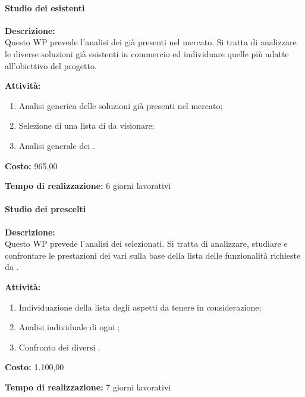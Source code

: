 \paragraph{Studio dei \sw esistenti }
\begin{description}
\item{\bfseries Descrizione:}\\
Questo WP prevede l'analisi dei \sw già presenti nel mercato. Si tratta di analizzare le diverse soluzioni già esistenti in commercio ed individuare quelle più adatte all'obiettivo del progetto. 

  \item  {\bfseries Attività:}
	\begin{enumerate}
		  \item Analisi generica delle soluzioni \sw già presenti nel mercato;
		  \item Selezione di una lista di \sw da visionare;
		  \item Analisi generale dei \sw.
		\end{enumerate}
  \item  {\bfseries Costo:} \text{\euro} 965,00 
  \item  {\bfseries Tempo di realizzazione:} 6 giorni lavorativi
\end{description}

\paragraph{Studio dei \sw prescelti}
\begin{description}
\item{\bfseries Descrizione:}\\
Questo WP prevede l'analisi dei \sw selezionati. Si tratta di analizzare, studiare e confrontare le prestazioni dei vari \sw sulla base della lista delle funzionalità richieste da \customer.

\item  {\bfseries Attività:}
\begin{enumerate}
		\item Individuazione della lista degli aspetti da tenere in considerazione;
		\item Analisi individuale di ogni \sw;
		\item Confronto dei diversi \sw.
		\end{enumerate}

\item  {\bfseries Costo:} \text{\euro} 1.100,00 
\item  {\bfseries Tempo di realizzazione:} 7 giorni lavorativi
\end{description}


